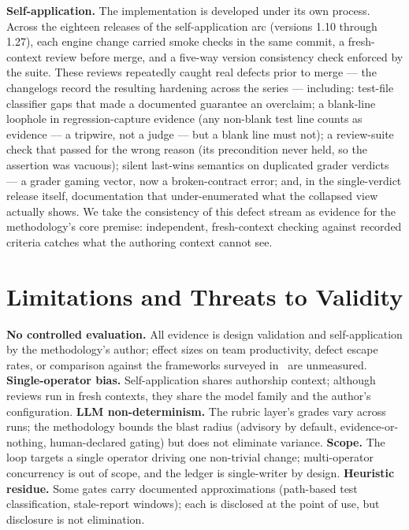 \documentclass[11pt]{article}
\begin{document}
\textbf{Self-application.} The implementation is developed under its own
process. Across the eighteen releases of the self-application arc (versions
1.10 through 1.27), each engine change carried smoke checks in the same commit,
a fresh-context review before merge, and a five-way version consistency check
enforced by the suite. These reviews repeatedly caught real defects prior to
merge --- the changelogs record the resulting hardening across the series ---
including: test-file
classifier gaps that made a documented guarantee an overclaim; a blank-line
loophole in regression-capture evidence (any non-blank test line counts as
evidence --- a tripwire, not a judge --- but a blank line must not); a
review-suite check that passed for the wrong reason (its precondition never
held, so the assertion was vacuous); silent last-wins semantics on
duplicated grader verdicts --- a grader gaming vector, now a broken-contract
error; and, in the single-verdict release itself, documentation that
under-enumerated what the collapsed view actually shows. We take the
consistency of this defect stream as evidence for the methodology's core
premise: independent, fresh-context checking against recorded criteria
catches what the authoring context cannot see.

\section{Limitations and Threats to Validity}\label{sec:limitations}

\textbf{No controlled evaluation.} All evidence is design validation and
self-application by the methodology's author; effect sizes on team
productivity, defect escape rates, or comparison against the frameworks
surveyed in~\cite{demacedo2026prompt} are unmeasured.
\textbf{Single-operator bias.} Self-application shares authorship context;
although reviews run in fresh contexts, they share the model family and the
author's configuration.
\textbf{LLM non-determinism.} The rubric layer's grades vary across runs;
the methodology bounds the blast radius (advisory by default,
evidence-or-nothing, human-declared gating) but does not eliminate variance.
\textbf{Scope.} The loop targets a single operator driving one non-trivial
change; multi-operator concurrency is out of scope, and the ledger is
single-writer by design.
\textbf{Heuristic residue.} Some gates carry documented approximations
(path-based test classification, stale-report windows); each is disclosed at
the point of use, but disclosure is not elimination.
\end{document}
